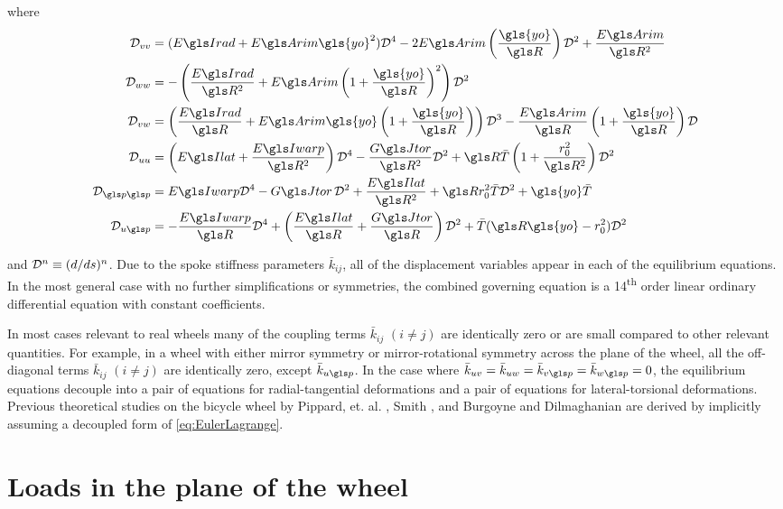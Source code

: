 \documentclass[\rootdir/thesis.tex]{subfiles}
\begin{document}
where
\begin{align*}
\D_{vv} &= (\EIr + \EA\gls{yo}^2)\D^4 - 2\EA\left(\frac{\gls{yo}}{\R}\right)\D^2 + \frac{\EA}{\R^2}\\
\D_{ww} &= -\left(\frac{\EIr}{\R^2} + \EA\left(1+\frac{\gls{yo}}{\R}\right)^2\right)\D^2\\
\D_{vw} &= \left(\frac{\EIr}{\R} + \EA\gls{yo}\left(1+\frac{\gls{yo}}{\R}\right)\right)\D^3 - \frac{\EA}{\R}\left(1+\frac{\gls{yo}}{\R}\right)\D\\
\D_{uu} &= \left(\EIl + \frac{\EIw}{\R^2}\right)\D^4 - \frac{\GJ}{\R^2}\D^2
    + \R\bar{T}\left(1 + \frac{\ro^2}{\R^2}\right)\D^2\\
\D_{\p\p} &= \EIw\D^4 - \GJ\,\D^2 + \frac{\EIl}{\R^2}
    + \R \ro^2\bar{T}\D^2 + \gls{yo}\bar{T}\\
\D_{u\p} &= -\frac{\EIw}{\R}\D^4 + \left(\frac{\EIl}{\R} + \frac{\GJ}{\R}\right)\D^2
    + \bar{T}(\R\gls{yo} - \ro^2)\D^2
\end{align*}

and $\mathcal{D}^n \equiv (d/ds)^n$. Due to the spoke stiffness parameters $\bar{k}_{ij}$, all of the displacement variables appear in each of the equilibrium equations. In the most general case with no further simplifications or symmetries, the combined governing equation is a 14\textsuperscript{th} order linear ordinary differential equation with constant coefficients.

In most cases relevant to real wheels many of the coupling terms $\bar{k}_{ij}$ $(i \neq j)$ are identically zero or are small compared to other relevant quantities. For example, in a wheel with either mirror symmetry or mirror-rotational symmetry across the plane of the wheel, all the off-diagonal terms $\bar{k}_{ij}$ $(i \neq j)$ are identically zero, except $\bar{k}_{u\p}$. In the case where $\bar{k}_{uv}=\bar{k}_{uw}=\bar{k}_{v\p}=\bar{k}_{w\p}=0$, the equilibrium equations decouple into a pair of equations for radial-tangential deformations and a pair of equations for lateral-torsional deformations. Previous theoretical studies on the bicycle wheel by Pippard, et. al. \cite{Pippard1931,Pippard1932a,Pippard1932b}, Smith \cite{Smith1901}, and Burgoyne and Dilmaghanian \cite{Burgoyne1993} are derived by implicitly assuming a decoupled form of \eqref{eq:EulerLagrange}.

\section{Loads in the plane of the wheel}
\label{sec:RadTan}

\end{document}
